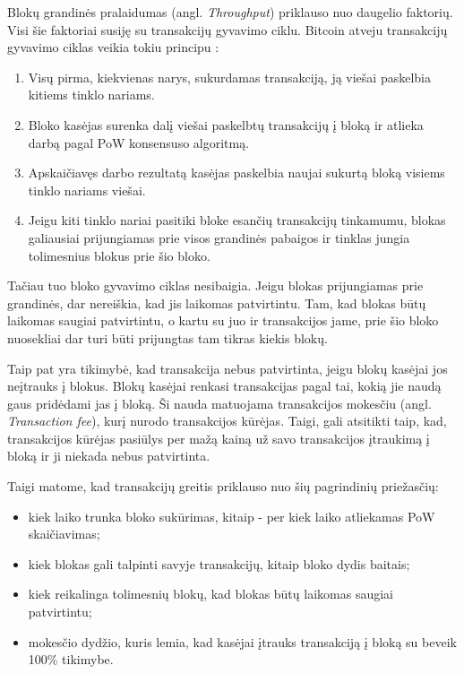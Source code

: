 Blokų grandinės pralaidumas (angl. \textit{Throughput}) priklauso nuo daugelio faktorių. Visi šie faktoriai susiję su transakcijų gyvavimo ciklu. Bitcoin atveju transakcijų gyvavimo ciklas veikia tokiu principu \cite{nakamoto2008bitcoin}:
\begin{enumerate}
    \item Visų pirma, kiekvienas narys, sukurdamas transakciją, ją viešai paskelbia kitiems tinklo nariams. 
    \item Bloko kasėjas surenka dalį viešai paskelbtų transakcijų į bloką ir atlieka darbą pagal PoW konsensuso algoritmą.
    \item Apskaičiavęs darbo rezultatą kasėjas paskelbia naujai sukurtą bloką visiems tinklo nariams viešai. 
    \item Jeigu kiti tinklo nariai pasitiki bloke esančių transakcijų tinkamumu, blokas galiausiai prijungiamas prie visos grandinės pabaigos ir tinklas jungia tolimesnius blokus prie šio bloko. 
\end{enumerate}

Tačiau tuo bloko gyvavimo ciklas nesibaigia. Jeigu blokas prijungiamas prie grandinės, dar nereiškia, kad jis laikomas patvirtintu. Tam, kad blokas būtų laikomas saugiai patvirtintu, o kartu su juo ir transakcijos jame, prie šio bloko nuosekliai dar turi būti prijungtas tam tikras kiekis blokų. 

Taip pat yra tikimybė, kad transakcija nebus patvirtinta, jeigu blokų kasėjai jos neįtrauks į blokus. Blokų kasėjai renkasi transakcijas pagal tai, kokią jie naudą gaus pridėdami jas į bloką. Ši nauda matuojama transakcijos mokesčiu (angl. \textit{Transaction fee}), kurį nurodo transakcijos kūrėjas. Taigi, gali atsitikti taip, kad, transakcijos kūrėjas pasiūlys per mažą kainą už savo transakcijos įtraukimą į bloką ir ji niekada nebus patvirtinta.

Taigi matome, kad transakcijų greitis priklauso nuo šių pagrindinių priežasčių: 
\begin{itemize}
    \item kiek laiko trunka bloko sukūrimas, kitaip - per kiek laiko atliekamas PoW skaičiavimas;
    \item kiek blokas gali talpinti savyje transakcijų, kitaip bloko dydis baitais;
    \item kiek reikalinga tolimesnių blokų, kad blokas būtų laikomas saugiai patvirtintu;
    \item mokesčio dydžio, kuris lemia, kad kasėjai įtrauks transakciją į bloką su beveik 100\% tikimybe.
\end{itemize} 


